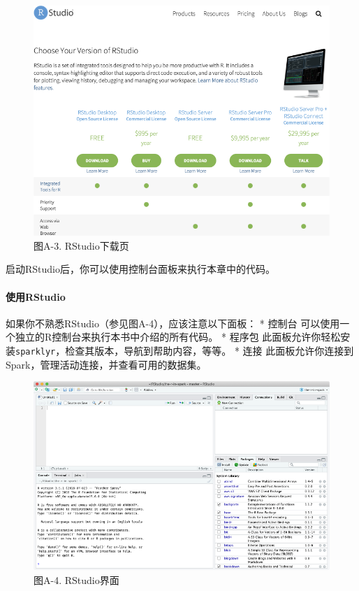 \documentclass[
]{article}
\begin{document}
\begin{figure}
\centering
\includegraphics{figures/A_3.png}
\caption{图A-3. RStudio下载页}
\end{figure}

启动RStudio后，你可以使用控制台面板来执行本章中的代码。

\hypertarget{ux4f7fux7528rstudio-1}{%
\paragraph{使用RStudio}\label{ux4f7fux7528rstudio-1}}

如果你不熟悉RStudio（参见图A-4），应该注意以下面板： * 控制台
可以使用一个独立的R控制台来执行本书中介绍的所有代码。 * 程序包
此面板允许你轻松安装\texttt{sparklyr}，检查其版本，导航到帮助内容，等等。
* 连接 此面板允许你连接到Spark，管理活动连接，并查看可用的数据集。

\begin{figure}
\centering
\includegraphics{figures/A_4.png}
\caption{图A-4. RStudio界面}
\end{figure}
\end{document}
